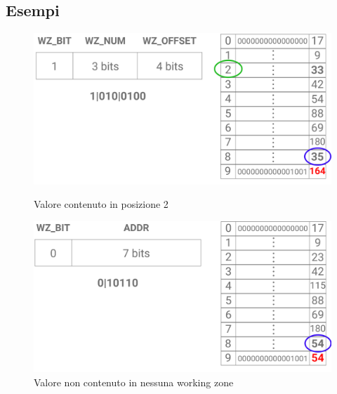 \documentclass[12pt]{article}
\begin{document}
\subsection{Esempi}
\begin{figure}[!htb]
    \centering
    \begin{minipage}[b]{1\textwidth}
        \includegraphics[width=\textwidth]{WZ_IN@2x.png}
        \captionsetup{justification=centering}
        \caption{Valore contenuto in posizione 2}\label{WZ_IN}
    \end{minipage}
    \hfill
    \vspace{1cm}
    \begin{minipage}[b]{1\textwidth}
        \includegraphics[width=\textwidth]{WZ_OUT@2x.png}
        \captionsetup{justification=centering}
        \caption{Valore non contenuto in nessuna working zone}\label{WZ_OUT}
    \end{minipage}
\end{figure}
\newpage
\end{document}
